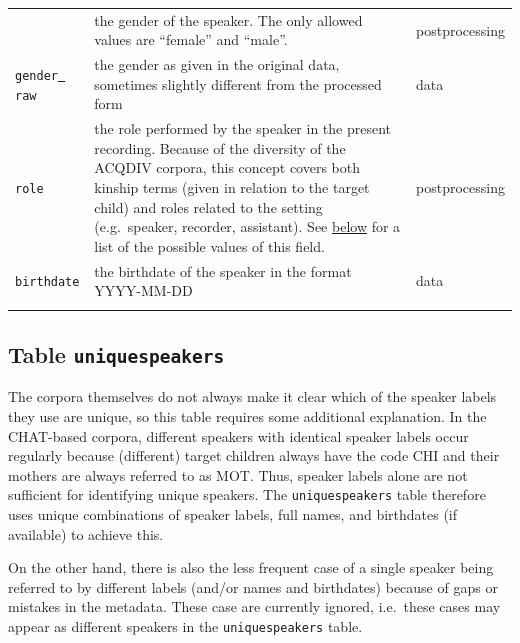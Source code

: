 \documentclass[a4paper, 11pt]{book}
\newcommand{\und}{\underline{{ }}\hspace{0.2mm}}	%
\begin{document}
\begin{longtable}{lp{.5\linewidth}p{.2\linewidth}}

	\label{tab:Table speakers}
\end{longtable}


\subsection{Table \texttt{uniquespeakers}}
\label{subsec:Table uniquespeakers}

The corpora themselves do not always make it clear which of the speaker labels they use are unique, so this table requires some additional explanation. 
In the CHAT-based corpora, different speakers with identical speaker labels occur regularly because (different) target children always have the code CHI and their mothers are always referred to as MOT. Thus, speaker labels alone are not sufficient for identifying unique speakers. The \texttt{uniquespeakers} table therefore uses unique combinations of speaker labels, full names, and birthdates (if available) to achieve this. %

On the other hand, there is also the less frequent case of a single speaker being referred to by different labels (and/or names and birthdates) because of gaps or mistakes in the metadata. These case are currently ignored, i.e.\ these cases may appear as different speakers in the \texttt{uniquespeakers} table. 
\end{document}
